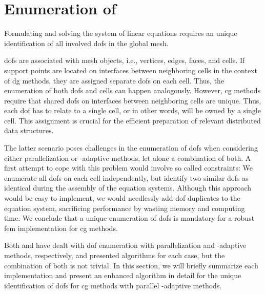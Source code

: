 \section{Enumeration of }
\label{sec:enumeration}

Formulating and solving the system of linear equations requires an unique identification of all involved \glspl{dof} in the global mesh.

\Glspl{dof} are associated with mesh objects, i.e., vertices, edges, faces, and cells. If support points are located on interfaces between neighboring cells in the context of \gls{dg} methods, they are assigned separate \glspl{dof} on each cell. Thus, the enumeration of both \glspl{dof} and cells can happen analogously. However, \gls{cg} methods require that shared \glspl{dof} on interfaces between neighboring cells are unique. Thus, each \gls{dof} has to relate to a single cell, or in other words, will be owned by a single cell. This assignment is crucial for the efficient preparation of relevant distributed data structures.


The latter scenario poses challenges in the enumeration of \glspl{dof} when considering either parallelization or \hp-adaptive methods, let alone a combination of both. A first attempt to cope with this problem would involve so called constraints: We enumerate all \glspl{dof} on each cell independently, but identify two similar \glspl{dof} as identical during the assembly of the equation systems. Although this approach would be easy to implement, we would needlessly add \gls{dof} duplicates to the equation system, sacrificing performance by wasting memory and computing time. We conclude that a unique enumeration of \glspl{dof} is mandatory for a robust \gls{fem} implementation for \gls{cg} methods.

Both \textcite{bangerth2012} and \textcite{bangerth2009} have dealt with \gls{dof} enumeration with parallelization and \hp-adaptive methods, respectively, and presented algorithms for each case, but the combination of both is not trivial. In this section, we will briefly summarize each implementation and present an enhanced algorithm in detail for the unique identification of \glspl{dof} for \gls{cg} methods with parallel \hp-adaptive methods.


